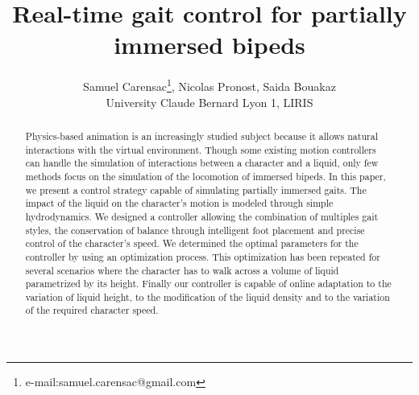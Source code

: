 \documentclass[conference]{acmsiggraph}
\title{Real-time gait control for partially immersed bipeds}
\author{Samuel Carensac\thanks{e-mail:samuel.carensac@gmail.com}, Nicolas Pronost, Saida Bouakaz\\University Claude Bernard Lyon 1, LIRIS}
\begin{document}

\maketitle

\begin{abstract}

Physics-based animation is an increasingly studied subject because it allows natural interactions with the virtual environment. Though some existing motion controllers can handle the simulation of interactions between a character and a liquid, only few methods focus on the simulation of the locomotion of immersed bipeds. In this paper, we present a control strategy capable of simulating partially immersed gaits. The impact of the liquid on the character's motion is modeled through simple hydrodynamics. We designed a controller allowing the combination of multiples gait styles, the conservation of balance through intelligent foot placement and precise control of the character's speed. We determined the optimal parameters for the controller by using an optimization process. This optimization has been repeated for several scenarios where the character has to walk across a volume of liquid parametrized by its height. Finally our controller is capable of online adaptation to the variation of liquid height, to the modification of the liquid density and to the variation of the required character speed.

\end{abstract}

\begin{CRcatlist}
\end{CRcatlist}
\end{document}
